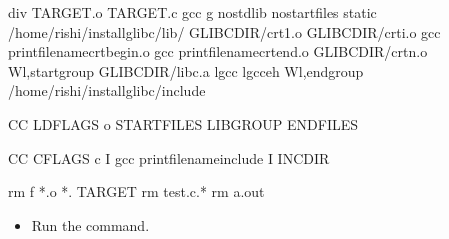 \documentclass[letterpaper,10pt,english]{sphinxmanual}
\begin{document}
\begin{sphinxVerbatim}[commandchars=\\\{\},numbers=left,firstnumber=1,stepnumber=1]
  div
  TARGET.o
  TARGET.c
  gcc
  \PYGZhy{}g
  \PYGZhy{}nostdlib \PYGZhy{}nostartfiles \PYGZhy{}static
  /home/rishi/install\PYGZus{}glibc/lib/
  GLIBCDIR/crt1.o GLIBCDIR/crti.o gcc \PYGZhy{}\PYGZhy{}print\PYGZhy{}file\PYGZhy{}namecrtbegin.o
  gcc \PYGZhy{}\PYGZhy{}print\PYGZhy{}file\PYGZhy{}namecrtend.o GLIBCDIR/crtn.o
  \PYGZhy{}Wl,\PYGZhy{}\PYGZhy{}start\PYGZhy{}group GLIBCDIR/libc.a \PYGZhy{}lgcc \PYGZhy{}lgcc\PYGZus{}eh \PYGZhy{}Wl,\PYGZhy{}\PYGZhy{}end\PYGZhy{}group
  /home/rishi/install\PYGZus{}glibc/include

 
	CC LDFLAGS \PYGZhy{}o  STARTFILES \PYGZdl{}\PYGZca{} LIBGROUP ENDFILES 

 
	CC CFLAGS \PYGZhy{}c \PYGZdl{}\PYGZca{} \PYGZhy{}I gcc \PYGZhy{}\PYGZhy{}print\PYGZhy{}file\PYGZhy{}nameinclude \PYGZhy{}I INCDIR

	rm \PYGZhy{}f *.o *.\PYGZti{} TARGET
	rm test.c.*
	rm a.out


\end{sphinxVerbatim}
\begin{itemize}
\item {} 
Run the  command.

\end{itemize}
\end{document}
